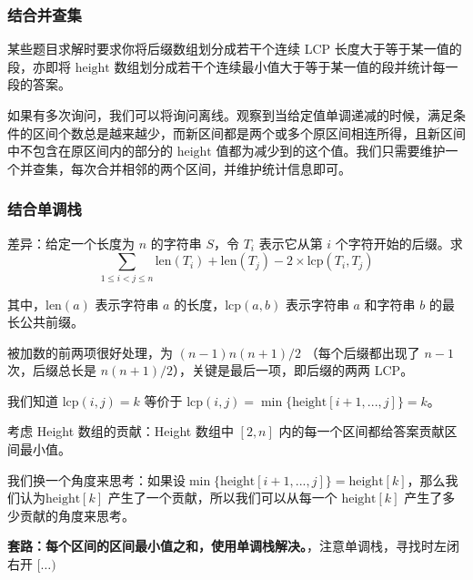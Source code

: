 \subsubsection{结合并查集}
\par \noindent 
\par \noindent 某些题目求解时要求你将后缀数组划分成若干个连续 LCP 长度大于等于某一值的段，亦即将 $\text{height}$ 数组划分成若干个连续最小值大于等于某一值的段并统计每一段的答案。
~\\
\par \noindent 如果有多次询问，我们可以将询问离线。观察到当给定值单调递减的时候，满足条件的区间个数总是越来越少，而新区间都是两个或多个原区间相连所得，且新区间中不包含在原区间内的部分的 $\text{height}$ 值都为减少到的这个值。我们只需要维护一个并查集，每次合并相邻的两个区间，并维护统计信息即可。
\subsubsection{结合单调栈}
\par \noindent 
\begin{tcolorbox}
\par [AHOI2013]差异：给定一个长度为 $n$ 的字符串 $S$，令 $T_i$ 表示它从第 $i$ 个字符开始的后缀。求
$$ \sum_{1\leq i<j\leq n}\text{len}(T_i)+\text{len}(T_j)-2\times\text{lcp}(T_i,T_j)$$
\par 其中，$\text{len}(a)$ 表示字符串 $a$ 的长度，$\text{lcp}(a,b)$ 表示字符串 $a$ 和字符串 $b$ 的最长公共前缀。
\end{tcolorbox}

\par \noindent 被加数的前两项很好处理，为 $(n-1)n(n+1)/2$ （每个后缀都出现了 $n-1$ 次，后缀总长是 $n(n+1)/2$），关键是最后一项，即后缀的两两 LCP。
~\\
\par 我们知道  $\text{lcp}(i,j)=k$ 等价于 $\text{lcp}(i,j)=\min\{\text{height}[i+1,...,j]\}=k$。
~\\
\par 考虑 Height 数组的贡献：Height 数组中 $[2, n]$ 内的每一个区间都给答案贡献区间最小值。
~\\
\par \noindent 我们换一个角度来思考：如果设$\min\{\text{height}[i+1,...,j]\}=\text{height}[k]$，那么我们认为$\text{height}[k]$ 产生了一个贡献，所以我们可以从每一个 $\text{height}[k]$ 产生了多少贡献的角度来思考。
~\\
\par \noindent  \textbf{套路：每个区间的区间最小值之和，使用单调栈解决。}，注意单调栈，寻找时左闭右开 $[ \dots)$

